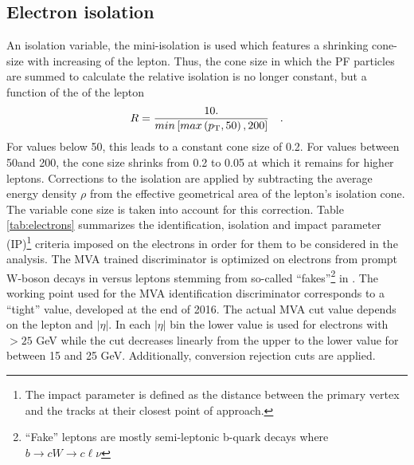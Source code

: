\subsection*{Electron isolation}
\newpara
\noindent\justify  
An isolation variable, the mini-isolation is used which features a shrinking cone-size with increasing \pt of the lepton. 
Thus, the cone size in which the PF particles are summed to calculate the relative isolation is no longer constant, but a function of the \pt of the lepton
\begin{equation*}
    R = \frac{10.}{min\left[ max \left( p_{\mathrm{T}}, 50 \right), 200 \right]} \quad.
\end{equation*}
For \pt values below 50\GeV, this leads to a constant cone size of 0.2. 
For \pt values between 50\GeV and 200\GeV, the cone size shrinks from 0.2 to 0.05 at which it remains for higher \pt leptons.
Corrections to the isolation are applied by subtracting the average energy density $\rho$ from the effective geometrical area of the lepton's isolation cone. 
The variable cone size is taken into account for this correction.
\newpara
\noindent\justify  
Table \ref{tab:electrons} summarizes the identification, isolation and impact parameter (IP)\footnote{The impact parameter is defined as the distance between the primary vertex and the tracks at their closest point of approach.} criteria imposed on the electrons in order for them to be considered in the analysis.  
The MVA trained discriminator is optimized on electrons from prompt W-boson decays in \ttbar versus leptons stemming from so-called ``fakes''\footnote{``Fake'' leptons are mostly semi-leptonic b-quark decays where $b \rightarrow cW \rightarrow c\ell \nu$} in \ttbar. 
The working point used for the MVA identification discriminator corresponds to a ``tight'' value, developed at the end of 2016. 
The actual MVA cut value depends on the lepton \pt and $|\eta|$. 
In each $|\eta|$ bin the lower value is used for electrons with \pt $> 25$ GeV while the cut decreases linearly from the upper to the lower value for \pt between 15 and 25 GeV. 
Additionally, conversion rejection cuts are applied.                        

